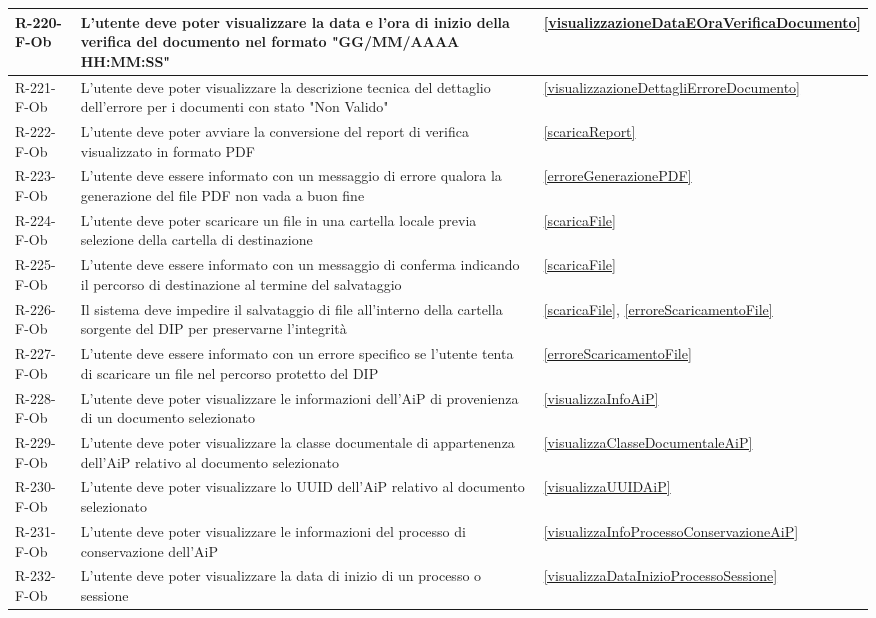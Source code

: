 \begin{longtable}{|p{2.5cm}|p{9.5cm}|p{2.5cm}|}
\hline
R-220-F-Ob & L'utente deve poter visualizzare la data e l'ora di inizio della verifica del documento nel formato "GG/MM/AAAA HH:MM:SS" & \ref{visualizzazioneDataEOraVerificaDocumento} \\
\hline
R-221-F-Ob & L'utente deve poter visualizzare la descrizione tecnica del dettaglio dell'errore per i documenti con stato "Non Valido" & \ref{visualizzazioneDettagliErroreDocumento} \\
\hline
R-222-F-Ob & L'utente deve poter avviare la conversione del report di verifica visualizzato in formato PDF & \ref{scaricaReport} \\
\hline
R-223-F-Ob & L'utente deve essere informato con un messaggio di errore qualora la generazione del file PDF non vada a buon fine & \ref{erroreGenerazionePDF} \\
\hline
R-224-F-Ob & L'utente deve poter scaricare un file in una cartella locale previa selezione della cartella di destinazione & \ref{scaricaFile} \\
\hline
R-225-F-Ob & L'utente deve essere informato con un messaggio di conferma indicando il percorso di destinazione al termine del salvataggio & \ref{scaricaFile} \\
\hline
R-226-F-Ob & Il sistema deve impedire il salvataggio di file all'interno della cartella sorgente del DIP per preservarne l'integrità & \ref{scaricaFile}, \ref{erroreScaricamentoFile} \\
\hline
R-227-F-Ob & L'utente deve essere informato con un errore specifico se l'utente tenta di scaricare un file nel percorso protetto del DIP & \ref{erroreScaricamentoFile} \\
\hline
R-228-F-Ob & L'utente deve poter visualizzare le informazioni dell'AiP di provenienza di un documento selezionato & \ref{visualizzaInfoAiP} \\
\hline
R-229-F-Ob & L'utente deve poter visualizzare la classe documentale di appartenenza dell'AiP relativo al documento selezionato & \ref{visualizzaClasseDocumentaleAiP} \\
\hline
R-230-F-Ob & L'utente deve poter visualizzare lo UUID dell'AiP relativo al documento selezionato & \ref{visualizzaUUIDAiP} \\
\hline
R-231-F-Ob & L'utente deve poter visualizzare le informazioni del processo di conservazione dell'AiP & \ref{visualizzaInfoProcessoConservazioneAiP} \\
\hline
R-232-F-Ob & L'utente deve poter visualizzare la data di inizio di un processo o sessione & \ref{visualizzaDataInizioProcessoSessione} \\

\end{longtable}
